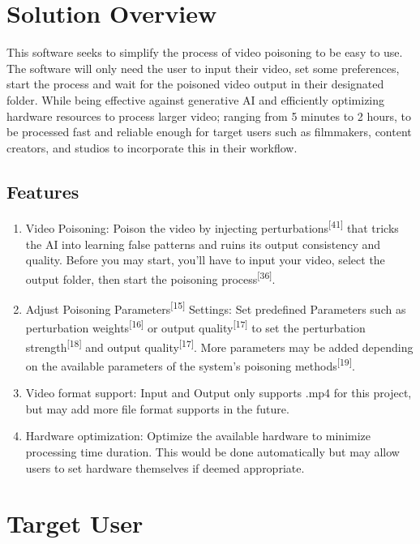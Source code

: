 \section{Solution Overview}
\label{section:solution-overview}

This software seeks to simplify the process of video poisoning to be easy to use.
The software will only need the user to input their video, set some preferences, start the process and wait for the poisoned video output in their designated folder.
While being effective against generative AI and efficiently optimizing hardware resources to process larger video; ranging from 5 minutes to 2 hours, to be processed fast and reliable enough for target users such as filmmakers, content creators, and studios to incorporate this in their workflow.

\subsection{Features}
\label{subsection:features}

\begin{enumerate}[leftmargin=80pt]
    \item Video Poisoning: Poison the video by injecting perturbations\textsuperscript{[41]} that tricks the AI into learning false patterns and ruins its output consistency and quality. Before you may start, you’ll have to input your video, select the output folder, then start the poisoning process\textsuperscript{[36]}.
    \item Adjust Poisoning Parameters\textsuperscript{[15]} Settings: Set predefined Parameters such as perturbation weights\textsuperscript{[16]} or output quality\textsuperscript{[17]} to set the perturbation strength\textsuperscript{[18]} and output quality\textsuperscript{[17]}. More parameters may be added depending on the available parameters of the system's poisoning methods\textsuperscript{[19]}.
       \item Video format support: Input and Output only supports .mp4 for this project, but may add more file format supports in the future.
       \item Hardware optimization: Optimize the available hardware to minimize processing time duration. This would be done automatically but may allow users to set hardware themselves if deemed appropriate.
\end{enumerate}

\section{Target User}
\label{section:target-user}

